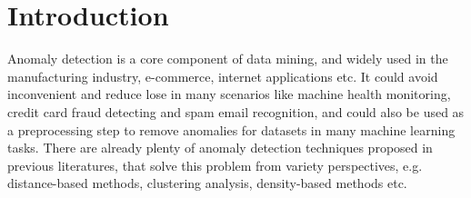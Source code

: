 \chapter{Introduction}
\label{chap:Introduction}

Anomaly detection is a core component of data mining, and widely used in the manufacturing industry, e-commerce, internet applications etc. It could avoid inconvenient and reduce lose in many scenarios like machine health monitoring, credit card fraud detecting and spam email recognition, and could also be used as a preprocessing step to remove anomalies for datasets in many machine learning tasks. There are already plenty of anomaly detection techniques proposed in previous literatures, that solve this problem from variety perspectives, e.g. distance-based methods, clustering analysis, density-based methods etc.\\

